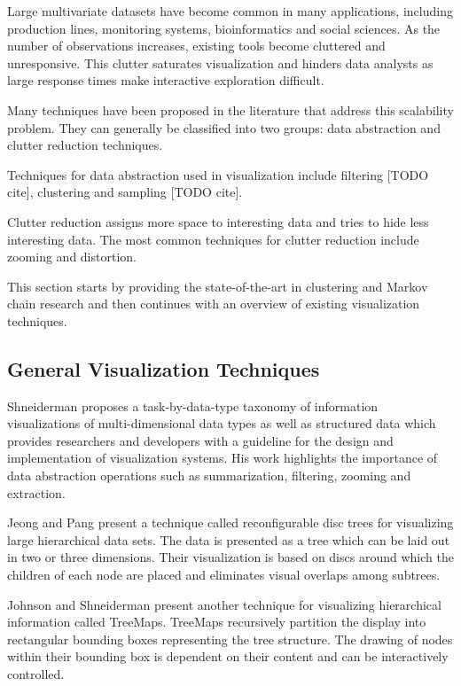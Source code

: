 Large multivariate datasets have become common in many applications, including production lines,
monitoring systems, bioinformatics and social sciences. As the number of observations increases,
existing tools become cluttered and unresponsive. This clutter saturates visualization and hinders
data analysts as large response times make interactive exploration difficult.

Many techniques have been proposed in the literature that address this scalability problem.
They can generally be classified into two groups: data abstraction and clutter reduction 
techniques.

Techniques for data abstraction used in visualization include filtering [TODO cite], clustering
and sampling [TODO cite].

Clutter reduction assigns more space to interesting data and tries to hide less interesting data.
The most common techniques for clutter reduction include zooming and distortion.

This section starts by providing the state-of-the-art in clustering and Markov chain research and
then continues with an overview of existing visualization techniques.

\subsection{General Visualization Techniques}

Shneiderman \cite{545307} proposes a task-by-data-type taxonomy of information visualizations of multi-dimensional
data types as well as structured data which provides researchers and developers with a guideline for
the design and implementation of visualization systems. His work highlights the importance of data
abstraction operations such as summarization, filtering, zooming and extraction.

Jeong and Pang \cite{729555} present a technique called reconfigurable disc trees for visualizing large 
hierarchical data sets. The data is presented as a tree which can be laid out in two or three dimensions.
Their visualization is based on discs around which the children of each node are placed and eliminates
visual overlaps among subtrees.

Johnson and Shneiderman \cite{Johnson:1991:TSA:949607.949654} present another technique for visualizing hierarchical
information called TreeMaps. TreeMaps recursively partition the display into rectangular bounding boxes representing the 
tree structure. The drawing of nodes within their bounding box is dependent on their content and can be interactively
controlled.


